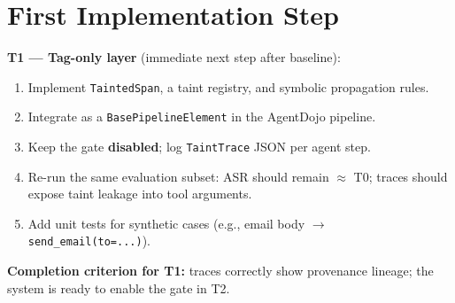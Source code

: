 \documentclass[11pt,a4paper]{article}
\begin{document}
\section{First Implementation Step}

\textbf{T1 --- Tag-only layer} (immediate next step after baseline):

\begin{enumerate}
  \item Implement \texttt{TaintedSpan}, a taint registry, and symbolic propagation rules.
  \item Integrate as a \texttt{BasePipelineElement} in the AgentDojo pipeline.
  \item Keep the gate \textbf{disabled}; log \texttt{TaintTrace} JSON per agent step.
  \item Re-run the same evaluation subset: ASR should remain $\approx$ T0; traces should expose taint leakage into tool arguments.
  \item Add unit tests for synthetic cases (e.g., email body $\rightarrow$ \texttt{send\_email(to=...)}).
\end{enumerate}

\textbf{Completion criterion for T1:} traces correctly show provenance lineage; the system is ready to enable the gate in T2.
\end{document}
